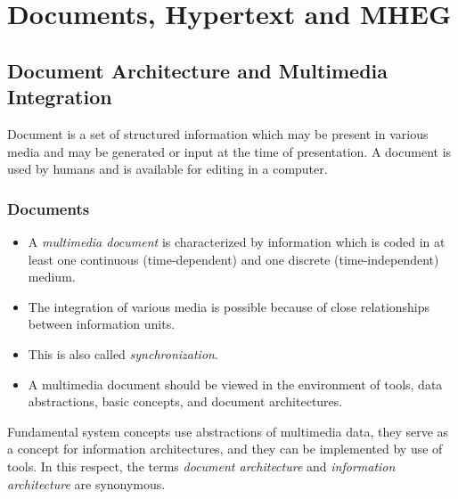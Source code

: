 \chapter{Documents, Hypertext and MHEG}

\section{Document Architecture and Multimedia Integration}
Document is a set of structured information which may be present in various media and may be generated or input at the time of presentation. A document is used by humans and is available for editing in a computer.

\subsection*{Documents}
\begin{itemize}
	\item A \emph{multimedia document} is characterized by information which is coded in at least one continuous (time-dependent) and one discrete (time-independent) medium. \item The integration of various media is possible because of close relationships between information units. 
	\item This is also called \emph{synchronization}. 
	\item A multimedia document should be viewed in the environment of tools, data abstractions, basic concepts, and document architectures.
	
\end{itemize}



Fundamental system concepts use abstractions of multimedia data, they serve as a concept for information architectures, and they can be implemented by use of tools. In this respect, the terms \textit{document architecture} and \textit{information architecture} are synonymous.


